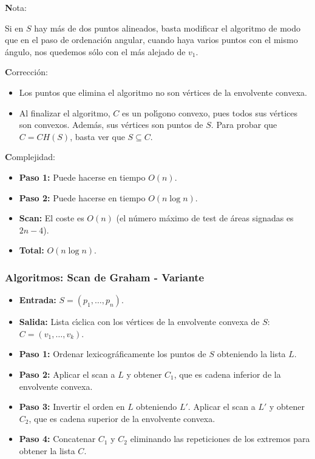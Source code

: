 \documentclass[ebook,oneside]{memoir}
\begin{document}
{\textbf Nota:}

Si en $S$ hay m\'{a}s de dos puntos alineados, basta
modificar el algoritmo de modo que en el paso de ordenaci\'{o}n
angular, cuando haya varios puntos con el mismo \'{a}ngulo, nos
quedemos s\'{o}lo con el m\'{a}s alejado de $v_1$.
\vspace{1cm}

{\textbf Correcci\'{o}n:}

\begin{itemize}
  \item Los puntos que elimina el algoritmo no son v\'{e}rtices de la
envolvente convexa.
  \item Al finalizar el algoritmo, $C$ es un pol\'{\i}gono convexo, pues
todos sus v\'{e}rtices son convexos. Adem\'{a}s, sus v\'{e}rtices son puntos
de $S$. Para probar que $C=CH(S)$, basta ver que $S \subseteq C$.
\end{itemize}

{\textbf Complejidad:}

\begin{itemize}
  \item\textbf{Paso 1:} Puede hacerse en tiempo $O(n)$.
  \item\textbf{Paso 2:} Puede hacerse en tiempo $O(n\log n)$.
  \item\textbf{Scan:} El coste es $O(n)$ (el n\'{u}mero m\'{a}ximo de test de
\'{a}reas signadas es $2n-4$).
  \item\textbf{Total:} $O(n\log n)$.
\end{itemize}

\subsubsection{Algoritmos: Scan de Graham - Variante}

\begin{itemize}
  \item\textbf{Entrada:} $S=(p_1,\dots,p_n)$.
  \item\textbf{Salida:} Lista c\'{\i}clica con los v\'{e}rtices de la envolvente
convexa de $S$: $C=(v_1,\dots,v_k)$.
  \item\textbf{Paso 1:} Ordenar lexicogr\'{a}ficamente los puntos de $S$
obteniendo la lista $L$.
  \item\textbf{Paso 2:} Aplicar el scan a $L$ y obtener $C_1$, que es
cadena inferior de la envolvente convexa.
  \item\textbf{Paso 3:} Invertir el orden en $L$ obteniendo $L'$. Aplicar
el scan a $L'$ y obtener $C_2$, que es cadena superior de la
envolvente convexa.
  \item\textbf{Paso 4:} Concatenar $C_1$ y $C_2$ eliminando las
repeticiones de los extremos para obtener la lista $C$.
\end{itemize}
\end{document}
